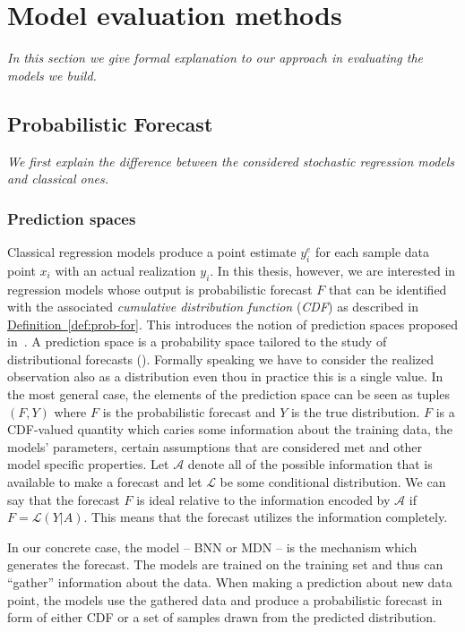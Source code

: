 \documentclass[12pt,a4paper,twoside]{scrartcl}
\numberwithin{equation}{section}
\newcommand{\refdef}[1]{\hyperref[#1]{Definition~\ref*{#1}}}
\begin{document}
\section{Model evaluation methods}\label{sec:criticism}
\noindent\emph{In this section we give formal explanation to our approach in evaluating the models we build.}
\subsection{Probabilistic Forecast}\label{sec:prob-forecast}
\emph{We first explain the difference between the considered stochastic regression models and classical ones.}
\subsubsection{Prediction spaces}\label{sec:pred-space}
Classical regression models produce a point estimate \(y_i^e\) for each sample data point \(x_i\) with an actual realization \(y_i\). In this thesis, however, we are interested in regression models whose output is probabilistic forecast \(F\) that can be identified with the associated \emph{cumulative distribution function} (\emph{CDF}) as described in \refdef{def:prob-for}. This introduces the notion of prediction spaces proposed in~\cite{gneiting2013}. A prediction space is a probability space tailored to the study of distributional forecasts (\cite{gneiting2014}). Formally speaking we have to consider the realized observation also as a distribution even thou in practice this is a single value. In the most general case, the elements of the prediction space can be seen as tuples \((F, Y)\) where \(F\) is the probabilistic forecast and \(Y\) is the true distribution. \(F\) is a CDF-valued quantity which caries some information about the training data, the models' parameters, certain assumptions that are considered met and other model specific properties. Let \(\mathcal{A}\) denote all of the possible information that is available to make a forecast and let \(\mathcal{L}\) be some conditional distribution. We can say that the forecast \(F\) is ideal relative to the information encoded by \(\mathcal{A}\) if \(F=\mathcal{L}(Y | A)\). This means that the forecast utilizes the information completely. 

In our concrete case, the model -- BNN or MDN -- is the mechanism which generates the forecast. The models are trained on the training set and thus can ``gather'' information about the data. When making a prediction about new data point, the models use the gathered data and produce a probabilistic forecast in form of either CDF or a set of samples drawn from the predicted distribution.
\end{document}
